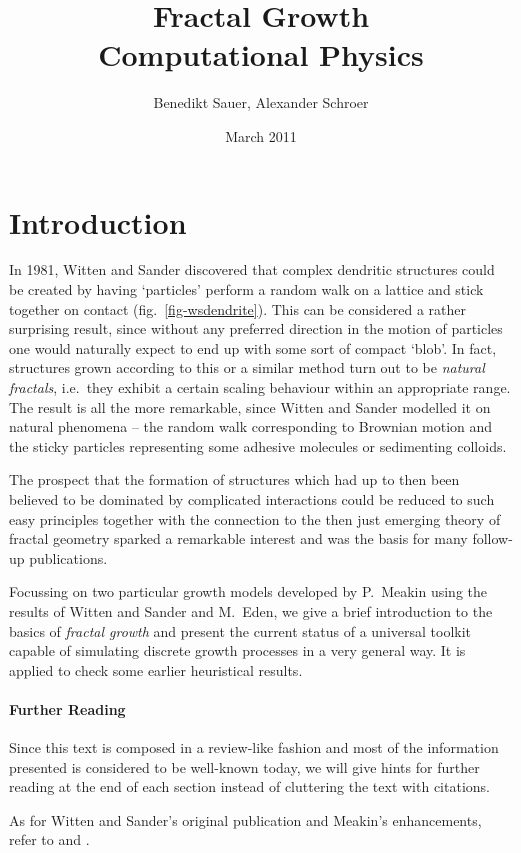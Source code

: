 \documentclass[twocolumn, 10pt]{scrartcl}
\begin{document}
    \title{Fractal Growth \\ {\small Computational Physics}}
    \author{\small Benedikt Sauer, Alexander Schroer}
    \date{\small March 2011}

    \maketitle
 
    \section{Introduction}
        In 1981, Witten and Sander discovered that complex dendritic structures could be created by having
        `particles' perform a random walk on a lattice and stick together on contact (fig.~\ref{fig-wsdendrite}).
        This can be considered a rather surprising result, since without any preferred direction in the motion of
        particles one would naturally expect to end up with some sort of compact `blob'. In fact, structures grown
        according to this or a similar method turn out to be \emph{natural fractals}, i.e.\ they exhibit a certain 
        scaling behaviour within an appropriate range. The result is all the more remarkable, since Witten and Sander
        modelled it on natural phenomena -- the random walk corresponding to Brownian motion and the sticky particles
        representing some adhesive molecules or sedimenting colloids.

        The prospect that the formation of structures which had up to then been believed to be dominated by complicated
        interactions could be reduced to such easy principles together with the connection to the then just emerging
        theory of fractal geometry sparked a remarkable interest and was the basis for many follow-up publications.

        Focussing on two particular growth models developed by P.~Meakin using the results of Witten and Sander and
        M.~Eden, we give a brief introduction to the basics of \emph{fractal growth} and present the current status of a
        universal toolkit capable of simulating discrete growth processes in a very general way. It is applied to check
        some earlier heuristical results.

        {\small
            \paragraph{Further Reading}
                Since this text is composed in a review-like fashion and most of the information presented is
                considered to be well-known today, we will give hints for further reading at the end of each
                section instead of cluttering the text with citations.

                As for Witten and Sander's original publication and Meakin's enhancements, refer to
                \cite{src-wittensander} and \cite{src-meakin1}.
        }
\end{document}
